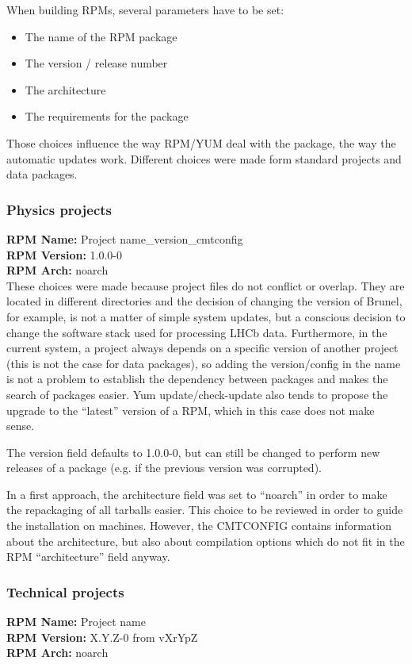 \documentclass{lhcbnote}
\begin{document}
When building RPMs, several parameters have to be set:
\begin{itemize}
\item The name of the RPM package
\item The version / release number
\item The architecture
\item The requirements for the package
\end{itemize}

Those choices influence the way RPM/YUM deal with the package, the way the automatic updates work.
Different choices were made form standard projects and data packages.

\subsubsection{Physics projects}
\textbf{RPM Name:} Project name\_version\_cmtconfig\\
\textbf{RPM Version:} 1.0.0-0 \\
\textbf{RPM Arch:} noarch \\

These choices were made because project files do not conflict or overlap. They are located in different directories and the decision of changing the version of Brunel, for example, is not a matter of simple system updates, but a conscious decision to change the software stack used for processing LHCb data. Furthermore, in the current system, a project always depends on a specific version of another project (this is not the case for data packages), so adding the version/config in the name is not a problem to establish the dependency between packages and makes the search of packages easier. Yum update/check-update also tends to propose the upgrade to the ``latest'' version of a RPM, which in this case does not make sense. 

The version field defaults to 1.0.0-0, but can still be changed to perform new releases of a package (e.g. if the previous version was corrupted).

In a first approach, the architecture field was set to ``noarch'' in order to make the repackaging of all tarballs easier. This choice to be reviewed in order to guide the installation on machines. However, the CMTCONFIG contains information about the architecture, but also about compilation options which do not fit in the RPM ``architecture'' field anyway.

\subsubsection{Technical projects}
\textbf{RPM Name:} Project name\\
\textbf{RPM Version:} X.Y.Z-0 from vXrYpZ \\
\textbf{RPM Arch:} noarch \\
\end{document}
